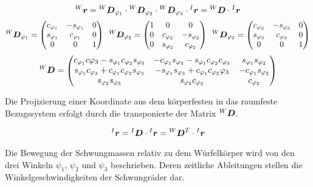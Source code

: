 \begin{equation}
\prescript{W}{}{}\boldsymbol{r} = \prescript{W}{}{}\boldsymbol{D}_{\varphi_1} \cdot \prescript{W}{}{}\boldsymbol{D}_{\varphi_2} \cdot \prescript{W}{}{}\boldsymbol{D}_{\varphi_3} \cdot \prescript{I}{}{}\boldsymbol{r} = \prescript{W}{}{}\boldsymbol{D} \cdot \prescript{I}{}{}\boldsymbol{r}
\end{equation}
\begin{equation}
\prescript{W}{}{}\boldsymbol{D}_{\varphi_1} = \begin{pmatrix}
c_{\varphi_1} & -s_{\varphi_1} & 0 \\
s_{\varphi_1} & c_{\varphi_1} & 0 \\
0 & 0 & 1
\end{pmatrix}
\hspace{5pt}
\prescript{W}{}{}\boldsymbol{D}_{\varphi_2} = \begin{pmatrix}
1 & 0 & 0 \\
0 & c_{\varphi_2} & -s_{\varphi_2} \\
0 & s_{\varphi_2} & c_{\varphi_2}
\end{pmatrix}
\hspace{5pt}
\prescript{W}{}{}\boldsymbol{D}_{\varphi_3} = \begin{pmatrix}
c_{\varphi_3} & -s_{\varphi_3} & 0  \\
s_{\varphi_3} & c_{\varphi_3} & 0 \\
0 & 0 & 1
\end{pmatrix}
\end{equation}
\begin{equation}
\prescript{W}{}{}\boldsymbol{D} = \begin{pmatrix}
c_{\varphi_1}c{\varphi_3} - s_{\varphi_1}c_{\varphi_2}s_{\varphi_3} &
-c_{\varphi_1}s_{\varphi_3} - s_{\varphi_1}c_{\varphi_2}c_{\varphi_3} &
s_{\varphi_1}s_{\varphi_2} \\
s_{\varphi_1}c_{\varphi_3}+c_{\varphi_1}c_{\varphi_2}s_{\varphi_3} &
-s_{\varphi_1}s_{\varphi_3}+c_{\varphi_1}c_{\varphi_2}{\varphi_3} &
-c_{\varphi_1}s_{\varphi_2} \\
s_{\varphi_2}s_{\varphi_3} &
s_{\varphi_2}c_{\varphi_3} &
c_{\varphi_2}
\end{pmatrix}
\end{equation}

Die Projizierung einer Koordinate aus dem körperfesten in das raumfeste Bezugssystem erfolgt durch die transponierte der Matrix $\prescript{W}{}{}\boldsymbol{D}$.

\begin{equation}
\prescript{I}{}{}\boldsymbol{r} = \prescript{I}{}{}\boldsymbol{D} \cdot \prescript{I}{}{}\boldsymbol{r} = \prescript{W}{}{}\boldsymbol{D}^T \cdot  \prescript{I}{}{}\boldsymbol{r}
\end{equation} 

Die Bewegung der Schwungmassen relativ zu dem Würfelkörper wird von den drei Winkeln $\psi_1$, $\psi_2$ und $\psi_3$ beschrieben. Deren zeitliche Ableitungen stellen die Winkelgeschwindigkeiten der Schwungräder dar. 

